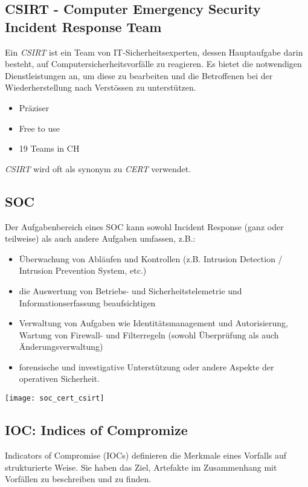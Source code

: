 \subsection{CSIRT - Computer Emergency Security Incident Response Team}
Ein \textit{CSIRT} ist ein Team von IT-Sicherheitsexperten, dessen Hauptaufgabe darin besteht, auf Computersicherheitsvorfälle zu reagieren.
Es bietet die notwendigen Dienstleistungen an, um diese zu bearbeiten und die Betroffenen bei der Wiederherstellung nach Verstössen zu unterstützen.\\

\begin{itemize}
    \item Präziser
    \item Free to use
    \item 19 Teams in CH\\
\end{itemize}

\textit{CSIRT} wird oft als synonym zu \textit{CERT} verwendet.

\subsection{SOC}
Der Aufgabenbereich eines SOC kann sowohl Incident Response (ganz oder teilweise) als auch andere Aufgaben umfassen, z.B.:

\begin{itemize}
    \item Überwachung von Abläufen und Kontrollen (z.B. Intrusion Detection / Intrusion Prevention System, etc.)
    \item die Auswertung von Betriebs- und Sicherheitstelemetrie und Informationserfassung beaufsichtigen
    \item Verwaltung von Aufgaben wie Identitätsmanagement und Autorisierung, Wartung von Firewall- und Filterregeln (sowohl Überprüfung als auch Änderungsverwaltung)
    \item forensische und investigative Unterstützung oder andere Aspekte der operativen Sicherheit.
\end{itemize}

\begin{center}
    \vspace{-8pt}
    \texttt{[image: soc\_cert\_csirt]}
    \vspace{-8pt}
\end{center}

\subsection{IOC: Indices of Compromize}
Indicators of Compromise (IOCs) definieren die Merkmale eines Vorfalls auf strukturierte Weise. Sie haben das Ziel, Artefakte im Zusammenhang mit Vorfällen zu beschreiben und zu finden.\\

